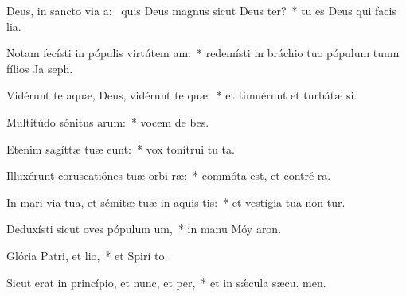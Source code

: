 \item Deus, in sancto via a:~\pscross{} quis Deus magnus sicut Deus ter?~* tu es Deus qui facis lia.
\item Notam fecísti in pópulis virtútem am:~* redemísti in bráchio tuo pópulum tuum fílios Ja  seph.
\item Vidérunt te aquæ, Deus, vidérunt te quæ:~* et timuérunt et turbátæ  si.
\item Multitúdo sónitus arum:~* vocem de bes.
\item Etenim sagíttæ tuæ eunt:~* vox tonítrui tu  ta.
\item Illuxérunt coruscatiónes tuæ orbi ræ:~* commóta est, et contré ra.
\item In mari via tua, et sémitæ tuæ in aquis tis:~* et vestígia tua non tur.
\item Deduxísti sicut oves pópulum um,~* in manu Móy  aron.
\item Glória Patri, et lio,~* et Spirí to.
\item Sicut erat in princípio, et nunc, et per,~* et in sǽcula sæcu. men.
